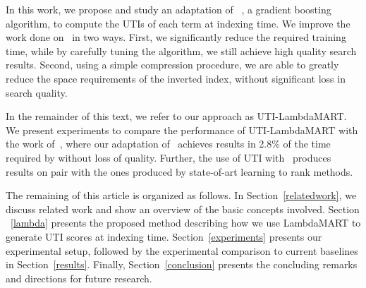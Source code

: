 \documentclass[preprint,review,10pt,3p]{elsarticle}
\begin{document}
In this work, we propose and study an adaptation of \lambdamart~\cite{wu2010lambdamart}, a gradient boosting algorithm, to compute the UTIs of each term at indexing time.
We improve the work done on \lepref\ in two ways. First, we significantly reduce the required training time, while by carefully tuning the algorithm, we still achieve high quality search results. Second, using a simple compression procedure, we are able to greatly reduce the space requirements of the inverted index, without significant loss in search quality. 

In the remainder of this text, we refer to our approach as UTI-LambdaMART. We present experiments to compare the performance of UTI-LambdaMART with the work of~\cite{costa2012lepref},
where our adaptation of \lambdamart\ achieves results in 2.8\% of the time required by \lepref %
without loss of quality. Further, the use of UTI with \lambdamart\ produces results on pair with the ones produced by state-of-art learning to rank methods.








The remaining of this article is organized as follows. In Section~\ref{relatedwork}, we discuss related work and show an overview of the basic concepts involved. Section ~\ref{lambda} presents the proposed method describing how we use LambdaMART to generate UTI scores at indexing time. Section~\ref{experiments} presents our experimental setup, followed by the experimental comparison to current baselines in Section~\ref{results}. Finally, Section~\ref{conclusion} presents the concluding remarks and directions for future research.
\end{document}
